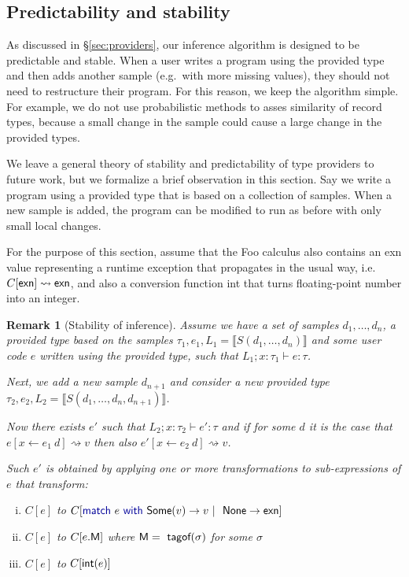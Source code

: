 \documentclass[10pt]{sigplanconf}
\newcommand{\kvd}[1]{\textnormal{\textcolor{kvdclr}{\sffamily #1}}}
\newcommand{\ident}[1]{\textnormal{\sffamily #1}}
\newcommand{\tytagof}{\ident{tagof}}
\newcommand{\reduce}{\rightsquigarrow}
\newcommand{\sem}[1]{\llbracket #1 \rrbracket}
\newcommand{\semalt}[1]{S(#1)}
\newtheorem{remark}{Remark}
\begin{document}

\subsection{Predictability and stability} 
\label{sec:impl-stable}

As discussed in \S\ref{sec:providers}, our inference algorithm is designed to be predictable
and stable. When a user writes a program using the provided type and then adds another sample 
(e.g.~with more missing values), they should not need to restructure their program. 
For this reason, we keep the algorithm simple. For example, we do not use probabilistic methods to 
asses similarity of record types, because a small change in the sample could cause a large change 
in the provided types.

We leave a general theory of stability and predictability of type providers to future work, but
we formalize a brief observation in this section. Say we write a program using a provided type
that is based on a collection of samples. When a new sample is added, the program can be modified
to run as before with only small local changes. 

For the purpose of this section, assume that the Foo calculus also contains an \ident{exn} 
value representing a runtime exception that propagates in the usual way, 
i.e.~$C[\ident{exn}]\reduce\ident{exn}$, and also a conversion function \ident{int} that
turns floating-point number into an integer.

\begin{remark}[Stability of inference]
Assume we have a set of samples $d_1, \ldots, d_n$, a provided type based on the samples
$\tau_1, e_1, L_1 = \sem{\semalt{d_1, \ldots, d_n}}$ and some user code $e$ written using
the provided type, such that $L_1; x:\tau_1\vdash e : \tau$. 

Next, we add a new sample $d_{n+1}$ and consider a new provided type 
$\tau_2, e_2, L_2 = \sem{\semalt{d_1, \ldots, d_n, d_{n+1}}}$.

Now there exists $e'$ such that $L_2; x:\tau_2\vdash e' : \tau$ and if
for some $d$ it is the case that $e[x\leftarrow e_1~d] \reduce v$ then
also $e'[x\leftarrow e_2~d] \reduce v$.

Such $e'$ is obtained by applying one or more transformations to sub-expressions of $e$
that transform:
%
\begin{enumerate}[(i)]
\item
$C[e]$ to $C[\kvd{match}~e~\kvd{with}~\ident{Some}(v) \rightarrow v~|~\ident{None} \rightarrow \ident{exn}]$
\item
$C[e]$ to $C[e.\ident{M}]$ where $\ident{M} = \tytagof(\sigma)$ for some $\sigma$
\item
$C[e]$ to $C[\ident{int}(e)]$
\end{enumerate}
\end{remark}
\end{document}
